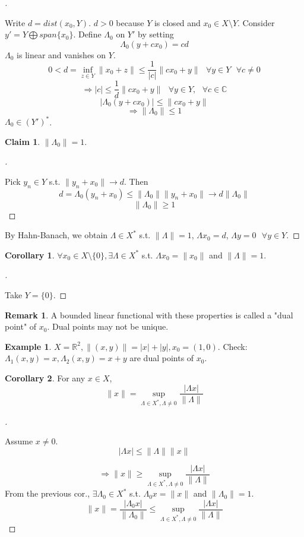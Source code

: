 \documentclass{article}
\newcommand{\sfa}{\text{  } \forall}
\theoremstyle{definition}
\newtheorem{ex}{Example}
\newtheorem{rem}{Remark}
\newtheorem{cor}{Corollary}
\newtheorem*{clm}{Claim}
\newenvironment{proofs}[1][\proofname]{%
  \begin{proof}[#1]$ $\par\nobreak\ignorespaces
}{%
  \end{proof}
}
\begin{document}
\begin{proofs}
	Write $d = dist(x_0, Y)$.
	$d > 0$ because $Y$ is closed and $x_0 \in X \setminus Y$.
	Consider $y' = Y \bigoplus span\{x_0 \}$.
	Define $\Lambda_0$ on $Y'$ by setting 
	\[
		\Lambda_0(y + c x_0) = cd
	\]
	$\Lambda_0$ is linear and vanishes on $Y$.
	\[
		0 < d = \inf_{z \in Y} \|x_0 + z \| \leq \frac{1}{|c|} \|c x_0 + y \| \sfa y \in Y \sfa c \neq 0
	\]
	\[
		\Rightarrow |c| \leq \frac{1}{d} \|c x_0 + y \| \sfa y \in Y , \sfa c \in \mathbb{C}
	\]
	\[
		|\Lambda_0(y + c x_0)| \leq \|c x_0 + y \|
	\]
	\[
		\Rightarrow \|\Lambda_0\| \leq 1
	\]
	$\Lambda_0 \in (Y')^*$.
	\begin{clm}
		$\|\Lambda_0 \| = 1$.
	\end{clm}

	\begin{proofs}
		Pick $y_n \in Y$ s.t. $\|y_n + x_0 \| \to d$.
		Then 
		\[
			d = \Lambda_0 (y_n + x_0) \leq \| \Lambda_0 \| \|y_n + x_0 \| \to d \|\Lambda_0 \|
		\]
		\[
			\| \Lambda_0 \| \geq 1
		\]
	\end{proofs}
	By Hahn-Banach, we obtain $\Lambda \in X^*$ s.t. $\|\Lambda \| = 1$, $\Lambda x_0 = d$, $\Lambda y = 0 \sfa y \in Y$.
\end{proofs}

\begin{cor}
	$\forall x_0 \in X \setminus \{0\}, \exists \Lambda \in X^*$ s.t. $\Lambda x_0 = \|x_0 \|$ and $\|\Lambda\| =1$.
\end{cor}

\begin{proofs}
	Take $Y = \{0\}$.
\end{proofs}
\begin{rem}
	A bounded linear functional with these properties is called a "dual point" of $x_0$.
	Dual points may not be unique.
\end{rem}

\begin{ex}
	$X = \mathbb{R}^2, \|(x, y)\| = |x| + |y|, x_0 = (1, 0)$.
	Check: $\Lambda_1(x, y) = x, \Lambda_2(x, y) = x + y$ are dual points of $x_0$.
\end{ex}

\begin{cor}
	For any $x \in X$, 
	\[
		\|x\| = \sup_{\Lambda \in X^*, \Lambda \neq 0} \frac{|\Lambda x|}{\|\Lambda\|}
	\]
\end{cor}

\begin{proofs}
	Assume $x \neq 0$.
	\[
		|\Lambda x| \leq \| \Lambda \| \|x \|
	\]
	
	\[
		\Rightarrow \|x \| \geq \sup_{\Lambda \in X^*, \Lambda \neq 0} \frac{|\Lambda x|}{\|\Lambda \|}
	\]
	From the previous cor., $\exists \Lambda_0 \in X^*$ s.t. $\Lambda_0 x = \|x\|$ and $\|\Lambda_0\| = 1$.
	\[
		\|x\| = \frac{|\Lambda_0 x|}{\|\Lambda_0\|} \leq \sup_{\Lambda \in X^*, \Lambda \neq 0} \frac{|\Lambda x|}{\|\Lambda\|}
	\]
\end{proofs}
\end{document}
